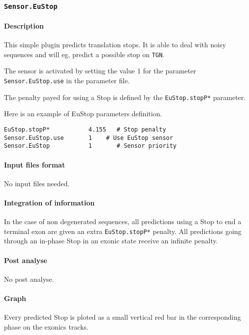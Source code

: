 
\subsubsection{\texttt{Sensor.EuStop}}

\paragraph{Description}

This simple plugin predicts translation stops. It is able to deal with
noisy sequences and will eg. predict a possible stop on \texttt{TGN}.

The sensor is activated by setting the value 1 for the parameter
\texttt{Sensor.EuStop.use} in the parameter file.

The penalty payed for using a Stop is defined by the
\texttt{EuStop.stopP*} parameter.

Here is an example of EuStop parameters definition.
\begin{Verbatim}[fontsize=\small]
EuStop.stopP*           4.155   # Stop penalty
Sensor.EuStop.use       1    # Use EuStop sensor
Sensor.EuStop           1       # Sensor priority
\end{Verbatim}

\paragraph{Input files format}

No input files  needed.

\paragraph{Integration of information}

In the case of non degenerated sequences, all predictions using a Stop
to end a terminal exon are given an extra \texttt{EuStop.stopP*}
penalty. All predictions going through an in-phase Stop in an exonic
state receive an infinite penalty.

\paragraph{Post analyse}

No post analyse.

\paragraph{Graph}

Every predicted Stop is ploted as a small vertical red bar in the
corresponding phase on the exonics tracks.


